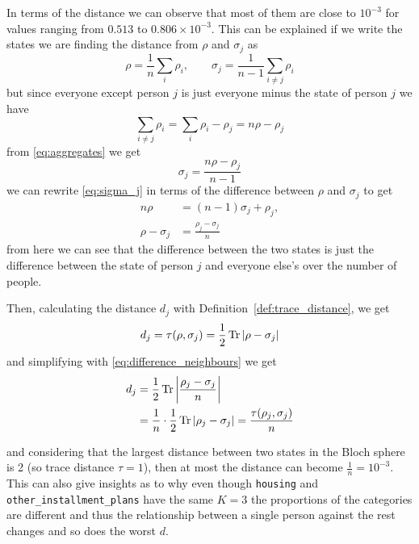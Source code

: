 \documentclass{ieeeaccess}
\begin{document}
In terms of the distance we can observe that most of them are close to $10^{-3}$ for values ranging from $0.513$ to $0.806 \times 10^{-3}$. This can be explained if we write the states we are finding the distance from $\rho$ and $\sigma_j$ as
\begin{equation}
  \rho = \frac{1}{n}\sum_{i} \rho_i, \qquad \sigma_j = \frac{1}{n-1}\sum_{i \neq j} \rho_i
  \label{eq:aggregates}
\end{equation}
but since everyone except person $j$ is just everyone minus the state of person $j$ we have
\begin{equation}
  \sum_{i \neq j} \rho_i = \sum_{i} \rho_i - \rho_j = n\rho - \rho_j
  \label{eq:sum_except_j}
\end{equation}
from \eqref{eq:aggregates} we get
\begin{equation}
  \sigma_j = \frac{n\rho - \rho_j}{n-1}
  \label{eq:sigma_j}
\end{equation}
we can rewrite \eqref{eq:sigma_j} in terms of the difference between $\rho$ and $\sigma_j$ to get
\begin{equation}
  \begin{aligned}
    n\rho &= (n-1)\sigma_j + \rho_j, \\
    \rho - \sigma_j &= \frac{\rho_j - \sigma_j}{n}
  \end{aligned}
  \label{eq:difference_neighbours}
\end{equation}
from here we can see that the difference between the two states is just the difference between the state of person $j$ and everyone else's over the number of people.

Then, calculating the distance $d_j$ with Definition~\ref{def:trace_distance}, we get
\begin{equation}
  d_j = \tau(\rho, \sigma_j) = \frac{1}{2}\Tr\abs{\rho - \sigma_j}
  \label{eq:d_j}
\end{equation}
and simplifying with \eqref{eq:difference_neighbours} we get
\begin{equation}
  \begin{aligned}
    d_j &= \frac{1}{2}\Tr\abs{\frac{\rho_j - \sigma_j}{n}} \\
        &= \frac{1}{n}\cdot\frac{1}{2}\Tr\abs{\rho_j - \sigma_j} = \frac{\tau(\rho_j, \sigma_j)}{n}
  \end{aligned}
  \label{eq:d_j_person}
\end{equation}

and considering that the largest distance between two states in the Bloch sphere is 2 (so trace distance $\tau =1$), then at most the distance can become $\frac{1}{n} = 10^{-3}$. This can also give insights as to why even though \texttt{housing} and \texttt{other\_installment\_plans} have the same $K=3$ the proportions of the categories are different and thus the relationship between a single person against the rest changes and so does the worst $d$.
\end{document}
